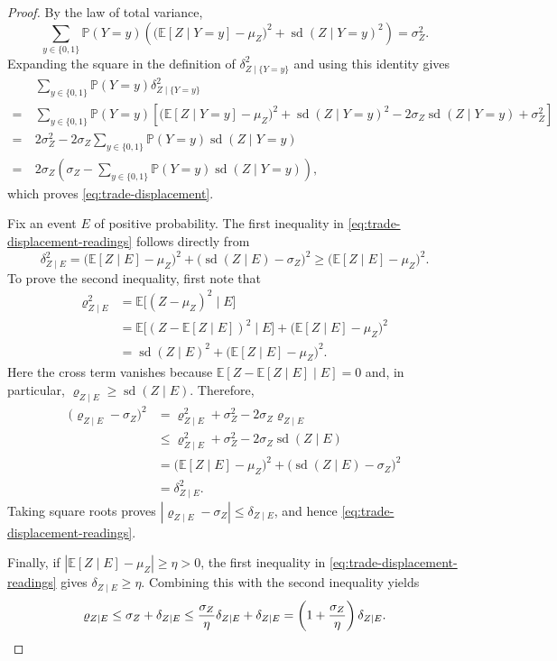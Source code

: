 \documentclass[11pt]{article}
\begin{document}
\begin{proof}
By the law of total variance,
\[
\sum_{{y \in \{0,1\}}} \mathbb{P}(Y=y)
\left(
    \bigl(\mathbb{E}[Z\mid Y=y]-\mu_Z\bigr)^2
    + \operatorname{sd}(Z\mid Y=y)^2
\right)
= \sigma_Z^2.
\]
Expanding the square in the definition of $\delta_{Z\mid\{Y=y\}}^2$
and using this identity gives
\[
\begin{aligned}
&\sum_{{y \in \{0,1\}}} \mathbb{P}(Y=y)\delta_{Z\mid\{Y=y\}}^2
\\
=~
&\sum_{{y \in \{0,1\}}} \mathbb{P}(Y=y)\!
\left[
    \bigl(\mathbb{E}[Z\mid Y=y]\!\!-\!\!\mu_Z\bigr)^2
   \!\! + \operatorname{sd}(Z\mid Y=y)^2
    \!\!-\! 2\sigma_Z\operatorname{sd}(Z\mid Y=y)
    + \sigma_Z^2
\right]\\
=~
&2\sigma_Z^2
-2\sigma_Z\sum_{{y \in \{0,1\}}}\mathbb{P}(Y=y)
    \operatorname{sd}(Z\mid Y=y)\\
=~
&2\sigma_Z
\left(
    \sigma_Z-\sum_{{y \in \{0,1\}}}\mathbb{P}(Y=y)
    \operatorname{sd}(Z\mid Y=y)
\right),
\end{aligned}
\]
which proves \eqref{eq:trade-displacement}.

{Fix an event $E$ of positive probability. The} first inequality in \eqref{eq:trade-displacement-readings} follows directly from
\[
\delta_{Z\mid E}^2
=
\bigl(\mathbb{E}[Z\mid E]-\mu_Z\bigr)^2
+
\bigl(\operatorname{sd}(Z\mid E)-\sigma_Z\bigr)^2
\ge
\bigl(\mathbb{E}[Z\mid E]-\mu_Z\bigr)^2.
\]
To prove the second inequality, first note that
\[
\begin{aligned}
\varrho_{Z\mid E}^2
&=\mathbb{E}\bigl[(Z-\mu_Z)^2\mid E\bigr]\\
&=\mathbb{E}\bigl[
    (Z-\mathbb{E}[Z\mid E])^2\mid E
\bigr]
+\bigl(\mathbb{E}[Z\mid E]-\mu_Z\bigr)^2\\
&=\operatorname{sd}(Z\mid E)^2
+\bigl(\mathbb{E}[Z\mid E]-\mu_Z\bigr)^2.
\end{aligned}
\]
Here the cross term vanishes because
$\mathbb{E}[Z-\mathbb{E}[Z\mid E]\mid E]=0$ and, in particular,
$\varrho_{Z\mid E}\ge\operatorname{sd}(Z\mid E)$.
Therefore,
\[
\begin{aligned}
\bigl(\varrho_{Z\mid E}-\sigma_Z\bigr)^2
&=\varrho_{Z\mid E}^2+\sigma_Z^2
    -2\sigma_Z\varrho_{Z\mid E}\\
&\le
\varrho_{Z\mid E}^2+\sigma_Z^2
    -2\sigma_Z\operatorname{sd}(Z\mid E)\\
&=
\bigl(\mathbb{E}[Z\mid E]-\mu_Z\bigr)^2
+\bigl(\operatorname{sd}(Z\mid E)-\sigma_Z\bigr)^2\\
&=\delta_{Z\mid E}^2.
\end{aligned}
\]
Taking square roots proves
$|\varrho_{Z\mid E}-\sigma_Z|\le\delta_{Z\mid E}$,
and hence \eqref{eq:trade-displacement-readings}.

Finally, if $|\mathbb{E}[Z\mid E]-\mu_Z|\ge\eta>0$,
the first inequality in \eqref{eq:trade-displacement-readings} gives $\delta_{Z\mid E}\ge\eta$.
Combining this with the second inequality yields
\[
\varrho_{Z\mid E}
\le \sigma_Z+\delta_{Z\mid E}
\le \frac{\sigma_Z}{\eta}\delta_{Z\mid E}
    +\delta_{Z\mid E}
=
\left(1+\frac{\sigma_Z}{\eta}\right)\delta_{Z\mid E}. \qedhere
\]
\end{proof}
\end{document}
